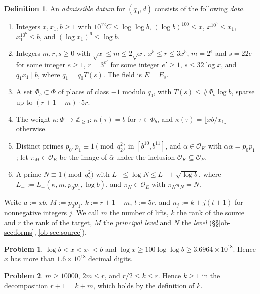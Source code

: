 \documentclass[reqno]{amsart}
\theoremstyle{plain}
\theoremstyle{definition}
\newtheorem{problem}{Problem}[section]
\newtheorem{definition}[theorem]{Definition}
\newcommand{\Z}{{\mathbb{Z}}}
\newcommand{\Oc}{\mathcal O}
\begin{document}
\begin{definition}\label{def:data}
An \emph{admissible datum} for \((q_0, d)\) consists of the following \emph{data}.
\begin{enumerate}
\item Integers \(x, x_1, b \ge 1\) with \(10^{12} C \le \log\log b\), \((\log b)^{100} \le x\), \(x^{10^6} \le x_1\), \(x_1^{10^6} \le b\), and \((\log x_1)^6 \le \log b\).
\item Integers \(m, r, s \ge 0\) with \(\sqrt x \le m \le 2\sqrt x\), \(x^5 \le r \le 3x^5\), \(m = 2^{e}\) and \(s = 22e\) for some integer \(e \ge 1\), \(r = 3^{e'}\) for some integer \(e' \ge 1\), \(s \le 32 \log x\), and \(q_1 x_1 \mid b\), where \(q_1 = q_0 T(s)\).  The field is \(E = E_s\).
\item A set \(\Phi_b \subset \Phi\) of places of class \(-1\) modulo \(q_0\), with \(T(s) \le \#\Phi_b \log b\), sparse up to \((r + 1 - m) \cdot 5r\).
\item The weight \(\kappa \colon \Phi \to \Z_{\ge 0}\): \(\kappa(\tau) = b\) for \(\tau \in \Phi_b\), and \(\kappa(\tau) = \lfloor xb/x_1 \rfloor\) otherwise.
\item Distinct primes \(p_0, p_1 \equiv 1 \pmod{q_2^2}\) in \([b^{10}, b^{11}]\), and \(\alpha \in \Oc_K\) with \(\alpha\bar\alpha = p_0 p_1\); let \(\pi_M \in \Oc_E\) be the image of \(\bar\alpha\) under the inclusion \(\Oc_K \subseteq \Oc_E\).
\item A prime \(N \equiv 1 \pmod{q_2^2}\) with \(L_- \le \log N \le L_- + \sqrt{\log b}\), where \(L_- := L_-(\kappa, m, p_0p_1, \log b)\), and \(\pi_N \in \Oc_E\) with \(\pi_N \bar\pi_N = N\).
\end{enumerate}
\end{definition}

Write \(a := xb\), \(M := p_0 p_1\), \(k := r + 1 - m\), \(t := 5r\), and \(n_j := k + j(t + 1)\) for nonnegative integers \(j\).  We call \(m\) the number of lifts, \(k\) the rank of the source and \(r\) the rank of the target, \(M\) the \emph{principal level} and \(N\) the \emph{level} (\S\S\ref{ob-sec:forms}, \ref{ob-sec:source}).

\begin{problem}\label{pr:chain}
\(\log b < x < x_1 < b\) and \(\log x \ge 100\log\log b \ge 3.6964 \times 10^{18}\).
Hence \(x\) has more than \(1.6 \times 10^{18}\) decimal digits.
\end{problem}

\begin{problem}\label{pr:m-big}
\(m \ge 10000\), \(2m \le r\), and \(r/2 \le k \le r\).  Hence \(k \ge 1\) in the decomposition \(r + 1 = k + m\), which holds by the definition of \(k\).
\end{problem}
\end{document}
